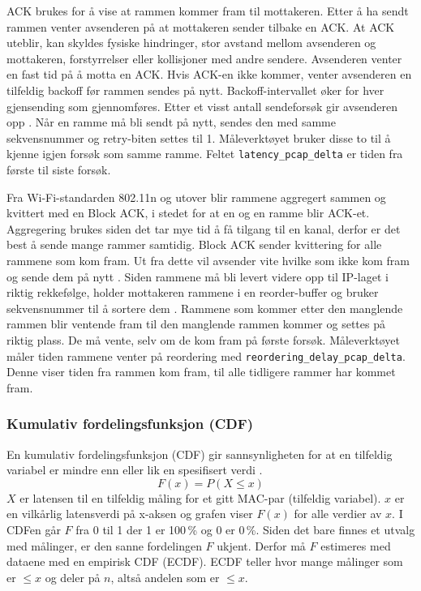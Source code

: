 \documentclass[norsk]{uiobachelorthesis}
\begin{document}
ACK brukes for å vise at rammen kommer fram til mottakeren. Etter å ha sendt rammen venter avsenderen på at mottakeren sender tilbake en ACK. At ACK uteblir, kan skyldes fysiske hindringer, stor avstand mellom avsenderen og mottakeren, forstyrrelser eller kollisjoner med andre sendere. Avsenderen venter en fast tid på å motta en ACK. Hvis ACK-en ikke kommer, venter avsenderen en tilfeldig backoff før rammen sendes på nytt. Backoff-intervallet øker for hver gjensending som gjennomføres. Etter et visst antall sendeforsøk gir avsenderen opp \parencite{kurose2025}. Når en ramme må bli sendt på nytt, sendes den med samme sekvensnummer og retry-biten settes til 1. Måleverktøyet bruker disse to til å kjenne igjen forsøk som samme ramme. Feltet \texttt{latency\_pcap\_delta} er tiden fra første til siste forsøk. 

Fra Wi-Fi-standarden 802.11n og utover blir rammene aggregert sammen og kvittert med en Block ACK, i stedet for at en og en ramme blir ACK-et. Aggregering brukes siden det tar mye tid å få tilgang til en kanal, derfor er det best å sende mange rammer samtidig. Block ACK sender kvittering for alle rammene som kom fram. Ut fra dette vil avsender vite hvilke  som ikke kom fram og sende dem på nytt \parencite[s.~38]{gast2013}. Siden rammene må bli levert videre opp til IP-laget i riktig rekkefølge, holder mottakeren rammene i en reorder-buffer og bruker sekvensnummer til å sortere dem \parencite{ieee80211-2020}. Rammene som kommer etter den manglende rammen blir ventende fram til den manglende rammen kommer og settes på riktig plass. De må vente, selv om de kom fram på første forsøk. Måleverktøyet måler tiden rammene venter på reordering med \texttt{reordering\_delay\_pcap\_delta}. Denne viser tiden fra rammen kom fram, til alle tidligere rammer har kommet fram.



	\subsubsection{Kumulativ fordelingsfunksjon (CDF)}
	\label{sec:cdf}
		En kumulativ fordelingsfunksjon (CDF) gir sannsynligheten for at en tilfeldig variabel er mindre enn eller lik en 				spesifisert verdi \parencite{wasserman2006}.
		\begin{equation} 
			F(x) = P(X \le x) 
			\label{eq:cdf}
		\end{equation}
		$X$ er latensen til en tilfeldig måling for et gitt MAC-par (tilfeldig variabel). $x$ er en vilkårlig latensverdi på x-aksen og grafen viser $F(x)$ for alle verdier av $x$. I CDFen går $F$ fra 0 til 1 der 1 er 100\,\% og 0 er 0\,\%. Siden det bare finnes et utvalg med målinger, er den sanne fordelingen $F$ ukjent. Derfor må $F$ estimeres med dataene
med en empirisk CDF (ECDF). ECDF teller hvor mange målinger som er $\le x$ og deler på $n$, altså andelen som er $\le x$.
\end{document}
